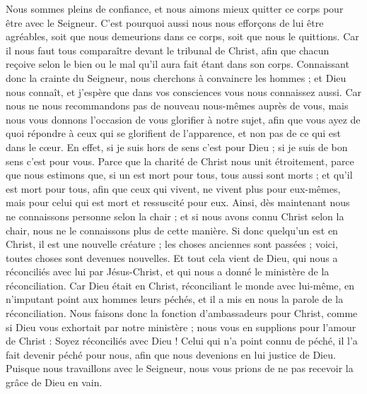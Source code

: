 \begin{multicols}{2}
Nous sommes pleins de confiance, et nous aimons mieux quitter ce corps pour être avec le Seigneur.
C'est pourquoi aussi nous nous efforçons de lui être agréables, soit que nous demeurions dans ce corps, soit que nous le quittions.
Car il nous faut tous comparaître devant le tribunal de Christ, afin que chacun reçoive selon le bien ou le mal qu’il aura fait étant dans son corps.
Connaissant donc la crainte du Seigneur, nous cherchons à convaincre les hommes ; et Dieu nous connaît, et j’espère que dans vos consciences vous nous connaissez aussi.
Car nous ne nous recommandons pas de nouveau nous-mêmes auprès de vous, mais nous vous donnons l'occasion de vous glorifier à notre sujet, afin que vous ayez de quoi répondre à ceux qui se glorifient de l'apparence, et non pas de ce qui est dans le cœur.
En effet, si je suis hors de sens c’est pour Dieu ; si je suis de bon sens c’est pour vous.
Parce que la charité de Christ nous unit étroitement, parce que nous estimons que, si un est mort pour tous, tous aussi sont morts ;
et qu'il est mort pour tous, afin que ceux qui vivent, ne vivent plus pour eux-mêmes, mais pour celui qui est mort et ressuscité pour eux.
Ainsi, dès maintenant nous ne connaissons personne selon la chair ; et si nous avons connu Christ selon la chair, nous ne le connaissons plus de cette manière.
Si donc quelqu'un est en Christ, il est une nouvelle créature ; les choses anciennes sont passées ; voici, toutes choses sont devenues nouvelles.
Et tout cela vient de Dieu, qui nous a réconciliés avec lui par Jésus-Christ, et qui nous a donné le ministère de la réconciliation.
Car Dieu était en Christ, réconciliant le monde avec lui-même, en n’imputant point aux hommes leurs péchés, et il a mis en nous la parole de la réconciliation.
Nous faisons donc la fonction d’ambassadeurs pour Christ, comme si Dieu vous exhortait par notre ministère ; nous vous en supplions pour l’amour de Christ : Soyez réconciliés avec Dieu !
Celui qui n’a point connu de péché, il l’a fait devenir péché pour nous, afin que nous devenions en lui justice de Dieu.
\VerseOne{}Puisque nous travaillons avec le Seigneur, nous vous prions de ne pas recevoir la grâce de Dieu en vain.

\end{multicols}

